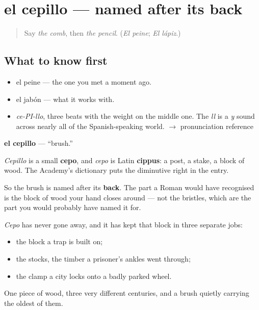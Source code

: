 \section[el cepillo]{el cepillo — named after its back}

\label{lesson:ES-C374-cepillo}



\begin{quote}
Say \emph{the comb}, then \emph{the pencil}. (\emph{El peine}; \emph{El lápiz}.)
\end{quote}

\subsection*{What to know first}
\begin{itemize}
\raggedright
  \item el peine — the one you met a moment ago.
  \item el jabón — what it works with.
\end{itemize}

\begin{sounds}
\begin{itemize}
\raggedright
  \item \emph{ce-PI-llo}, three beats with the weight on the middle one. The \emph{ll} is a \emph{y} sound across nearly all of the Spanish-speaking world. $\to$ pronunciation reference
\end{itemize}
\end{sounds}

\begin{cousinweb}
\textbf{el cepillo} — \textquotedblleft{}brush.\textquotedblright{}

\emph{Cepillo} is a small \textbf{cepo}, and \emph{cepo} is Latin \textbf{cippus}: a post, a stake, a block of wood. The Academy's dictionary puts the diminutive right in the entry.

So the brush is named after its \textbf{back}. The part a Roman would have recognised is the block of wood your hand closes around — not the bristles, which are the part you would probably have named it for.

\emph{Cepo} has never gone away, and it has kept that block in three separate jobs:

\begin{itemize}
\raggedright
  \item the block a trap is built on;
  \item the stocks, the timber a prisoner's ankles went through;
  \item the clamp a city locks onto a badly parked wheel.
\end{itemize}

One piece of wood, three very different centuries, and a brush quietly carrying the oldest of them.
\end{cousinweb}

